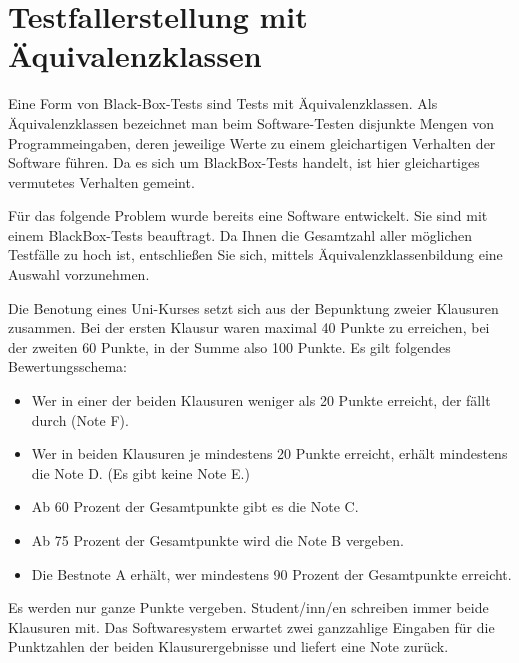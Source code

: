 \section{Testfallerstellung mit Äquivalenzklassen}
Eine Form von Black-Box-Tests sind Tests mit Äquivalenzklassen. Als Äquivalenzklassen bezeichnet man beim Software-Testen disjunkte Mengen von Programmeingaben, deren jeweilige Werte zu einem gleichartigen Verhalten der Software führen. Da es sich um BlackBox-Tests handelt, ist hier gleichartiges vermutetes Verhalten gemeint.

Für das folgende Problem wurde bereits eine Software entwickelt. Sie sind mit einem BlackBox-Tests beauftragt. Da Ihnen die Gesamtzahl aller möglichen Testfälle zu hoch ist, entschließen Sie sich, mittels Äquivalenzklassenbildung eine Auswahl vorzunehmen.

Die Benotung eines Uni-Kurses setzt sich aus der Bepunktung zweier Klausuren zusammen. Bei
der ersten Klausur waren maximal 40 Punkte zu erreichen, bei der zweiten 60 Punkte, in der Summe also 100 Punkte. Es gilt folgendes Bewertungsschema:
\begin{itemize}
    \item Wer in einer der beiden Klausuren weniger als 20 Punkte erreicht, der fällt durch (Note F).
    \item Wer in beiden Klausuren je mindestens 20 Punkte erreicht, erhält mindestens die Note D. (Es gibt keine Note E.)
    \item Ab 60 Prozent der Gesamtpunkte gibt es die Note C.
    \item Ab 75 Prozent der Gesamtpunkte wird die Note B vergeben.
    \item Die Bestnote A erhält, wer mindestens 90 Prozent der Gesamtpunkte erreicht.
\end{itemize}
Es werden nur ganze Punkte vergeben. Student/inn/en schreiben immer beide Klausuren mit. Das Softwaresystem erwartet zwei ganzzahlige Eingaben für die Punktzahlen der beiden Klausurergebnisse und liefert eine Note zurück.

